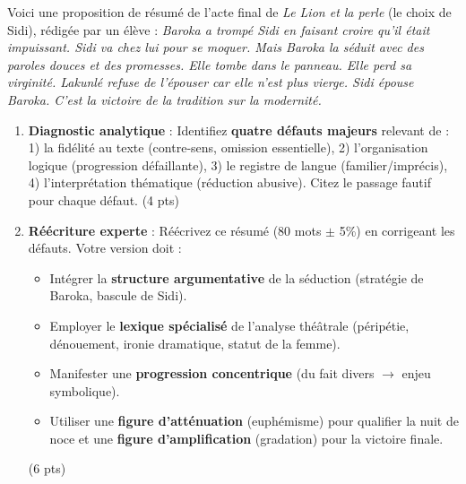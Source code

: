 \documentclass[11pt]{article}
\begin{document}
\begin{exercice}
Voici une proposition de résumé de l'acte final de \textit{Le Lion et la perle} (le choix de Sidi), rédigée par un élève :
\og \textit{Baroka a trompé Sidi en faisant croire qu'il était impuissant. Sidi va chez lui pour se moquer. Mais Baroka la séduit avec des paroles douces et des promesses. Elle tombe dans le panneau. Elle perd sa virginité. Lakunlé refuse de l'épouser car elle n'est plus vierge. Sidi épouse Baroka. C'est la victoire de la tradition sur la modernité.} \fg
\begin{enumerate}
    \item \textbf{Diagnostic analytique} : Identifiez \textbf{quatre défauts majeurs} relevant de : 1) la fidélité au texte (contre-sens, omission essentielle), 2) l'organisation logique (progression défaillante), 3) le registre de langue (familier/imprécis), 4) l'interprétation thématique (réduction abusive). Citez le passage fautif pour chaque défaut. (4 pts)
    \item \textbf{Réécriture experte} : Réécrivez ce résumé (80 mots $\pm$ 5\%) en corrigeant les défauts. Votre version doit : 
    \begin{itemize}
        \item Intégrer la \textbf{structure argumentative} de la séduction (stratégie de Baroka, bascule de Sidi).
        \item Employer le \textbf{lexique spécialisé} de l'analyse théâtrale (péripétie, dénouement, ironie dramatique, statut de la femme).
        \item Manifester une \textbf{progression concentrique} (du fait divers $\to$ enjeu symbolique).
        \item Utiliser une \textbf{figure d'atténuation} (euphémisme) pour qualifier la nuit de noce et une \textbf{figure d'amplification} (gradation) pour la victoire finale.
    \end{itemize}
    (6 pts)
\end{enumerate}
\end{exercice}
\end{document}
